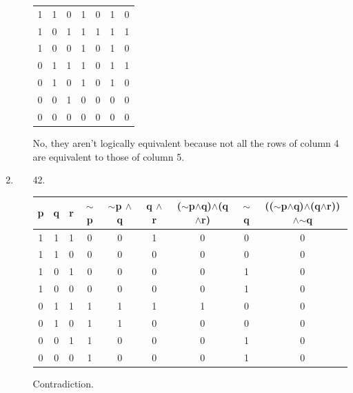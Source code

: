 \documentclass[12pt]{article}
\begin{document}
\begin{enumerate}[label = \alph*)]
\begin{itemize}
\begin{tabular}{ccc|c|c|c|c}
                    1 & 1 & 0 & 1 & 0 & 1 & 0 \\
                    1 & 0 & 1 & 1 & 1 & 1 & 1 \\
                    1 & 0 & 0 & 1 & 0 & 1 & 0 \\
                    0 & 1 & 1 & 1 & 0 & 1 & 1 \\
                    0 & 1 & 0 & 1 & 0 & 1 & 0 \\
                    0 & 0 & 1 & 0 & 0 & 0 & 0 \\
                    0 & 0 & 0 & 0 & 0 & 0 & 0 \\
                \end{tabular}
            \item []
                \vspace{1em}
                No, they aren't logically equivalent because not all the rows of
                column 4 are equivalent to those of column 5.
        \end{itemize}
    \item
        \begin{itemize}
            \item [42.]
                \begin{tabular}{ccc|c|c|c|c|c|c}
                    p & q & r & $\sim$p & $\sim$p $\wedge$ q & q $\wedge$ r &
                    ($\sim$p$\wedge$q)$\wedge$(q$\wedge$r) & $\sim$q &
                    (($\sim$p$\wedge$q)$\wedge$(q$\wedge$r))$\wedge$$\sim$q \\
                    \hline
                    1 & 1 & 1 & 0 & 0 & 1 & 0 & 0 & 0 \\
                    1 & 1 & 0 & 0 & 0 & 0 & 0 & 0 & 0 \\
                    1 & 0 & 1 & 0 & 0 & 0 & 0 & 1 & 0 \\
                    1 & 0 & 0 & 0 & 0 & 0 & 0 & 1 & 0 \\
                    0 & 1 & 1 & 1 & 1 & 1 & 1 & 0 & 0 \\
                    0 & 1 & 0 & 1 & 1 & 0 & 0 & 0 & 0 \\
                    0 & 0 & 1 & 1 & 0 & 0 & 0 & 1 & 0 \\
                    0 & 0 & 0 & 1 & 0 & 0 & 0 & 1 & 0 \\
                \end{tabular}
            \item []
                \vspace{0.84em}
                Contradiction.

\end{itemize}
\end{enumerate}
\end{document}
